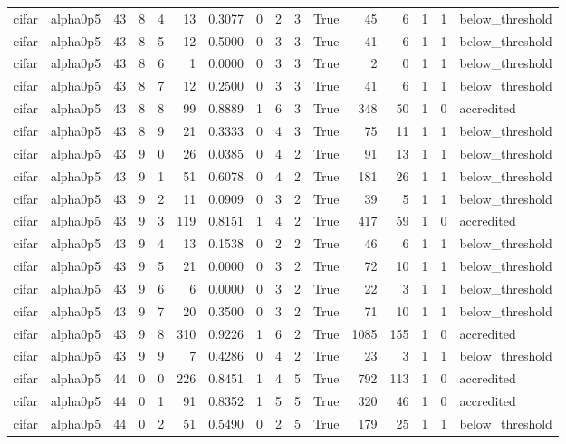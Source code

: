 \begin{tabular}{llrrrrrrrrrrrrrl}
cifar & alpha0p5 & 43 & 8 & 4 & 13 & 0.3077 & 0 & 2 & 3 & True & 45 & 6 & 1 & 1 & below\_threshold \\
cifar & alpha0p5 & 43 & 8 & 5 & 12 & 0.5000 & 0 & 3 & 3 & True & 41 & 6 & 1 & 1 & below\_threshold \\
cifar & alpha0p5 & 43 & 8 & 6 & 1 & 0.0000 & 0 & 3 & 3 & True & 2 & 0 & 1 & 1 & below\_threshold \\
cifar & alpha0p5 & 43 & 8 & 7 & 12 & 0.2500 & 0 & 3 & 3 & True & 41 & 6 & 1 & 1 & below\_threshold \\
cifar & alpha0p5 & 43 & 8 & 8 & 99 & 0.8889 & 1 & 6 & 3 & True & 348 & 50 & 1 & 0 & accredited \\
cifar & alpha0p5 & 43 & 8 & 9 & 21 & 0.3333 & 0 & 4 & 3 & True & 75 & 11 & 1 & 1 & below\_threshold \\
cifar & alpha0p5 & 43 & 9 & 0 & 26 & 0.0385 & 0 & 4 & 2 & True & 91 & 13 & 1 & 1 & below\_threshold \\
cifar & alpha0p5 & 43 & 9 & 1 & 51 & 0.6078 & 0 & 4 & 2 & True & 181 & 26 & 1 & 1 & below\_threshold \\
cifar & alpha0p5 & 43 & 9 & 2 & 11 & 0.0909 & 0 & 3 & 2 & True & 39 & 5 & 1 & 1 & below\_threshold \\
cifar & alpha0p5 & 43 & 9 & 3 & 119 & 0.8151 & 1 & 4 & 2 & True & 417 & 59 & 1 & 0 & accredited \\
cifar & alpha0p5 & 43 & 9 & 4 & 13 & 0.1538 & 0 & 2 & 2 & True & 46 & 6 & 1 & 1 & below\_threshold \\
cifar & alpha0p5 & 43 & 9 & 5 & 21 & 0.0000 & 0 & 3 & 2 & True & 72 & 10 & 1 & 1 & below\_threshold \\
cifar & alpha0p5 & 43 & 9 & 6 & 6 & 0.0000 & 0 & 3 & 2 & True & 22 & 3 & 1 & 1 & below\_threshold \\
cifar & alpha0p5 & 43 & 9 & 7 & 20 & 0.3500 & 0 & 3 & 2 & True & 71 & 10 & 1 & 1 & below\_threshold \\
cifar & alpha0p5 & 43 & 9 & 8 & 310 & 0.9226 & 1 & 6 & 2 & True & 1085 & 155 & 1 & 0 & accredited \\
cifar & alpha0p5 & 43 & 9 & 9 & 7 & 0.4286 & 0 & 4 & 2 & True & 23 & 3 & 1 & 1 & below\_threshold \\
cifar & alpha0p5 & 44 & 0 & 0 & 226 & 0.8451 & 1 & 4 & 5 & True & 792 & 113 & 1 & 0 & accredited \\
cifar & alpha0p5 & 44 & 0 & 1 & 91 & 0.8352 & 1 & 5 & 5 & True & 320 & 46 & 1 & 0 & accredited \\
cifar & alpha0p5 & 44 & 0 & 2 & 51 & 0.5490 & 0 & 2 & 5 & True & 179 & 25 & 1 & 1 & below\_threshold \\

\end{tabular}
